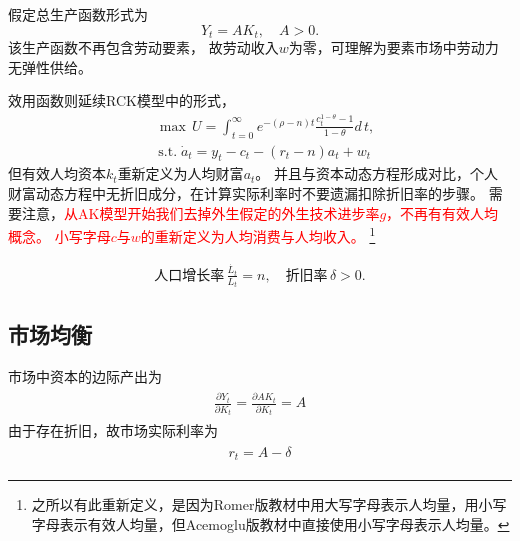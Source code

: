 \documentclass[cn,normal,11pt,black]{elegantnote}
\begin{document}
\begin{definition}[生产函数]
    假定总生产函数形式为
    \begin{equation}
        Y_t = A K_t, \quad A > 0.
    \end{equation}
    该生产函数不再包含劳动要素，
    故劳动收入$w$为零，可理解为要素市场中劳动力无弹性供给。
\end{definition}
\begin{definition}[个人效用函数]
    效用函数则延续RCK模型中的形式，
    \begin{align}
        & \max \, U  = \int_{t=0}^{\infty} e^{-(\rho - n)t} \frac{c_t^{1-\theta} -1}{1-\theta}  d \, t, \\
        & \, \mathrm{s.t.} \; \dot{a}_t =  y_t - c_t - (r_t - n)a_t + w_t
    \end{align}
    但有效人均资本$k_t$重新定义为人均财富$a_t$。
    并且与资本动态方程形成对比，个人财富动态方程中无折旧成分，在计算实际利率时不要遗漏扣除折旧率的步骤。
    需要注意，\textcolor{red}{从AK模型开始我们去掉外生假定的外生技术进步率$g$，不再有有效人均概念。
    小写字母$c$与$w$的重新定义为人均消费与人均收入。}
    \footnote{之所以有此重新定义，是因为Romer版教材中用大写字母表示人均量，用小写字母表示有效人均量，但Acemoglu版教材中直接使用小写字母表示人均量。}
\end{definition}
\begin{definition}[投入要素]
    \begin{align}
        \mbox{人口增长率} \, \frac{\dot{L_t}}{L_t} = n, \quad
        \mbox{折旧率} \, \delta > 0.
    \end{align}
\end{definition}

\subsection{市场均衡}

市场中资本的边际产出为
\begin{align}
\begin{aligned}
    \frac{\partial Y_t}{\partial K_t} = \frac{\partial AK_t}{\partial K_t} = A
\end{aligned}
\end{align}
由于存在折旧，故市场实际利率为
\begin{align}\label{AKRamr}
\begin{aligned}
    r_t = A - \delta  
\end{aligned}
\end{align}
\end{document}

